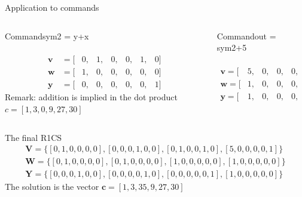 \documentclass[handouts]{beamer}
\begin{document}
\begin{frame}{Application to commands}   
    \begin{columns}[T] %
    \begin{column}{.48\textwidth}
    \begin{block}{Command}sym2 = y+x\end{block}
    
    \begin{align*}       
         [ &one,&x,&out,&sym_1,&y,&sym_2 ]\\ 
         \bm{v} &= [&0,&1,&0,&0,&1,&0]  \\ 
         \bm{w} &= [&1,&0,&0,&0,&0,&0]  \\
         \bm{y} &= [&0,&0,&0,&0,&0,&1] 
    \end{align*}    \pause
    Remark: addition is implied in the dot product
    $c = [1,3,0,9,27,30]$
    \end{column}%
    \hfill%
    \begin{column}{.48\textwidth}
    \begin{block}{Command}out = sym2+5\end{block}
    
    \begin{align*}     
         [ &one,&x,&out,&sym_1,&y,&sym_2 ]\\    
         \bm{v} = [&5,&0,&0,&0,&0,&1]  \\
         \bm{w} = [&1,&0,&0,&0,&0,&0]  \\
         \bm{y} = [&1,&0,&0,&0,&0,&0] 
    \end{align*}    
    \end{column}%
\end{columns} 
\end{frame}

\begin{frame}{The final R1CS}
    \begin{align*}        
         \bm{V} = \{[0,1,0,0,0,0], [0,0,0,1,0,0],[0,1,0,0,1,0],[5,0,0,0,0,1]  \}\\
         \bm{W} = \{[0,1,0,0,0,0],[0,1,0,0,0,0],[1,0,0,0,0,0] ,[1,0,0,0,0,0]  \}\\
         \bm{Y} = \{[0,0,0,1,0,0], [0,0,0,0,1,0], [0,0,0,0,0,1] ,[1,0,0,0,0,0]  \}
    \end{align*}  
    \pause
    The solution is the vector  $\bm{c} = [1,3,35,9,27,30] $
\end{frame}
\end{document}
